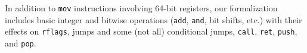 In addition to \lstinline|mov| instructions involving 64-bit registers, our formalization includes basic integer and bitwise operations (\lstinline|add|,
\lstinline|and|, bit shifts, etc.) with their effects on \lstinline|rflags|, jumps and some (not all) conditional jumps, \lstinline|call|, \lstinline|ret|, \lstinline|push|,
and \lstinline|pop|.

